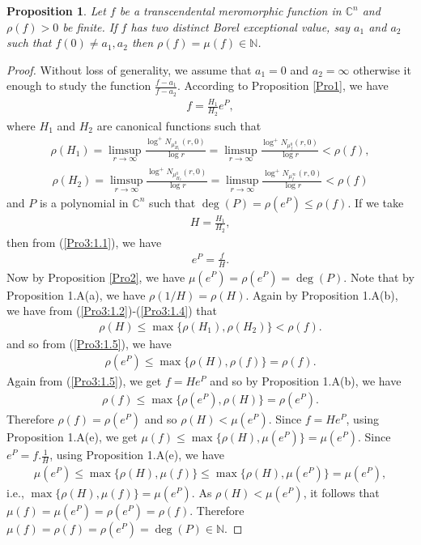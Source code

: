 \documentclass[11pt,reqno]{amsart}
\newtheorem{propo}{Proposition}[section]
\numberwithin{equation}{section}
\begin{document}
\begin{propo}\label{Pro3} Let $f$ be a transcendental meromorphic function in $\mathbb{C}^n$ and $\rho(f)>0$ be finite. If $f$ has two distinct Borel exceptional value, say $a_1$ and $a_2$ such that $f(0)\neq a_1,a_2$ then $\rho(f)=\mu(f)\in\mathbb{N}$.
\end{propo}
\begin{proof} Without loss of generality, we assume that $a_1=0$ and $a_2=\infty$ otherwise it enough to study the function $\frac{f-a_1}{f-a_2}$. According to Proposition \ref{Pro1}, we have
\begin{align}\label{Pro3:1.1}
f=\frac{H_1}{H_2}e^{P},
\end{align}
where $H_1$ and $H_2$ are canonical functions such that
\begin{align}\label{Pro3:1.2}
\rho(H_1)=\limsup\limits_{r\to \infty}\frac{\log^+ N_{\mu^0_{H_1}}(r,0)}{\log r}=\limsup\limits_{r\to \infty}\frac{\log^+ N_{\mu^0_{f}}(r,0)}{\log r}<\rho(f),
\end{align}
\begin{align}\label{Pro3:1.3}
\rho(H_2)=\limsup\limits_{r\to \infty}\frac{\log^+ N_{\mu^0_{H_2}}(r,0)}{\log r}=\limsup\limits_{r\to \infty}\frac{\log^+ N_{\mu^{\infty}_{f}}(r,0)}{\log r}<\rho(f)
\end{align}
and $P$ is a polynomial in $\mathbb{C}^n$ such that $\deg(P)=\rho(e^P)\leq \rho(f)$. If we take 
\begin{align}\label{Pro3:1.4}
H=\frac{H_1}{H_2},
\end{align}
then from (\ref{Pro3:1.1}), we have 
\begin{align}\label{Pro3:1.5}
e^P=\frac{f}{H}.
\end{align}
Now by Proposition \ref{Pro2}, we have $\mu(e^P)=\rho(e^P)=\deg(P)$. Note that by Proposition 1.A(a), we have $\rho(1/H)=\rho(H)$.
Again by Proposition 1.A(b), we have from (\ref{Pro3:1.2})-(\ref{Pro3:1.4}) that
\begin{align*}
\rho(H)\leq \max\{\rho(H_1),\rho(H_2)\}<\rho(f).
\end{align*}
and so from (\ref{Pro3:1.5}), we have
\begin{align*}
\rho(e^P)\leq \max\{\rho(H),\rho(f)\}=\rho(f).
\end{align*}
Again from (\ref{Pro3:1.5}), we get $f=He^P$ and so by Proposition 1.A(b), we have
\begin{align*}
\rho(f)\leq \max\{\rho(e^P),\rho(H)\}=\rho(e^P).
\end{align*}
Therefore $\rho(f)=\rho(e^P)$ and so $\rho(H)<\mu(e^P)$. Since $f=He^P$, using Proposition 1.A(e), we get $\mu(f)\leq \max\{\rho(H),\mu(e^P)\}=\mu(e^P)$. 
Since $e^P=f.\frac{1}{H}$, using Proposition 1.A(e), we have 
\begin{align*}
\mu(e^P)\leq \max\{\rho(H),\mu(f)\}\leq \max\{\rho(H),\mu(e^P)\}=\mu(e^P),
\end{align*}
i.e., $\max\{\rho(H),\mu(f)\}=\mu(e^P)$. As $\rho(H)<\mu(e^P)$, it follows that $\mu(f)=\mu(e^P)=\rho(e^P)=\rho(f)$. Therefore $\mu(f)=\rho(f)=\rho(e^P)=\deg(P)\in\mathbb{N}$.
\end{proof}
\end{document}
